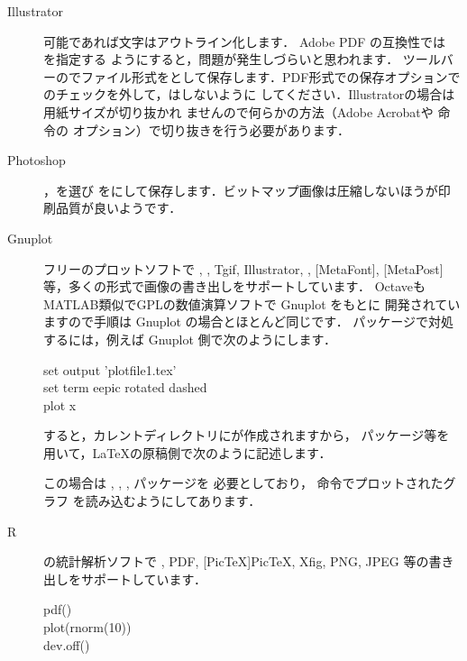 \begin{description}
\item[{Illustrator}]
  可能であれば文字はアウトライン化します．
  Adobe PDF の互換性では を指定する
  ようにすると，問題が発生しづらいと思われます．
  ツールバーのでファイル形式をとして保存します．PDF形式での保存オプションでの{チェックを外して}，はしないように
  してください．{Illustrator}の場合は用紙サイズが切り抜かれ
  ませんので何らかの方法（{Adobe Acrobat}や 
  命令の  オプション）で切り抜きを行う必要があります．
\item[{Photoshop}]
  ，を選び
  をにして保存します．ビットマップ画像は圧縮しないほうが印
  刷品質が良いようです．
\item[Gnuplot] フリーのプロットソフトで \PS, , {Tgif},
  {Illustrator}, , [MetaFont]{\MF},
  [MetaPost]{\MP}等，多くの形式で画像の書き出しをサポートしています．
  {Octave}も{MATLAB}類似でGPLの数値演算ソフトで Gnuplot をもとに
  開発されていますので手順は Gnuplot の場合とほとんど同じです．
  パッケージで対処するには，例えば Gnuplot 側で次のようにします．

\begin{intext}
set output 'plotfile1.tex'\\
set term eepic rotated dashed\\
plot x
\end{intext}

すると，カレントディレクトリにが作成されますから，
パッケージ等を用いて，\LaTeX の原稿側で次のように記述します．


  この場合は , , , パッケージを
  必要としており， 命令でプロットされたグラフ 
  を読み込むようにしてあります．
 \item[R] 
  の統計解析ソフトで \PS, PDF, [PicTeX]{Pic\TeX}, {Xfig}, 
  PNG, JPEG 等の書き出しをサポートしています．

\begin{intext}
pdf()\\
plot(rnorm(10))\\
dev.off()
\end{intext}  


\end{description}
